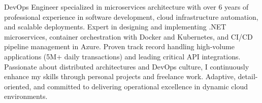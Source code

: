 

\begin{cvparagraph}

DevOps Engineer specialized in microservices architecture with over 6 years of professional experience in software development, cloud infrastructure automation, and scalable deployments. Expert in designing and implementing .NET microservices, container orchestration with Docker and Kubernetes, and CI/CD pipeline management in Azure. Proven track record handling high-volume applications (5M+ daily transactions) and leading critical API integrations. Passionate about distributed architectures and DevOps culture, I continuously enhance my skills through personal projects and freelance work. Adaptive, detail-oriented, and committed to delivering operational excellence in dynamic cloud environments.\end{cvparagraph}
